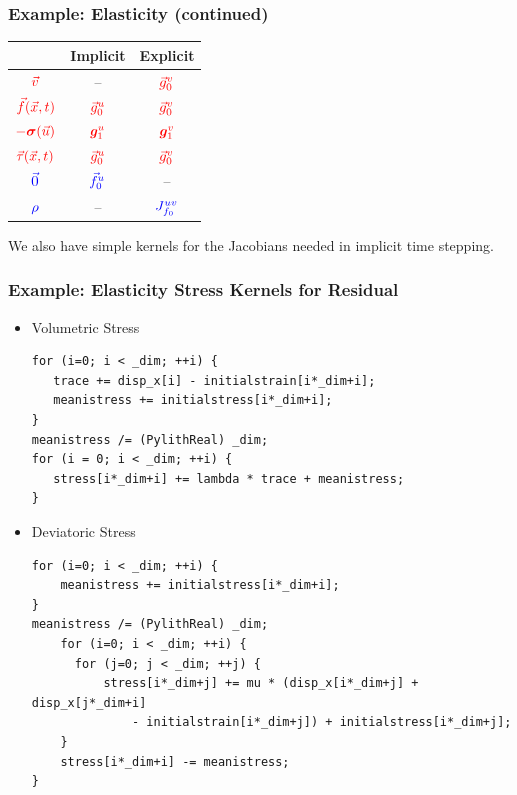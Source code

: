 \documentclass[aspectratio=169,hyperref=colorlinks]{beamer}
\begin{document}
\begin{frame}
  \frametitle{Example: Elasticity (continued)}

  {\centering
  \begin{tabular}{ccc}
    & {\bf Implicit} & {\bf Explicit} \\ \hline
    ${\color{red}\vec{v}}$   &   --   &   ${\color{red}\vec{g}_0^v}$ \\
    ${\color{red}\vec{f}(\vec{x},t)}$   &   ${\color{red}\vec{g}_0^u}$   &   ${\color{red}\vec{g}_0^v}$ \\
    ${\color{red}-\bm{\sigma}(\vec{u})}$   & ${\color{red}\bm{g}_1^u}$   &   ${\color{red}\bm{g}_1^v}$ \\
    ${\color{red}\vec{\tau}(\vec{x},t)}$   &   ${\color{red}\vec{g}_0^u}$   &   ${\color{red}\vec{g}_0^v}$ \\
    ${\color{blue}\vec{0}}$   &   ${\color{blue}\vec{f}_0^u}$ & -- \\
    ${\color{blue}\rho}$ & -- & ${\color{blue}J_{f_0}^{uv}}$ \\
    \hline
  \end{tabular}\par}
  \vfill
  We also have simple kernels for the Jacobians needed in implicit time stepping.

\end{frame}

\begin{frame}[fragile]
  \frametitle{Example: Elasticity Stress Kernels for Residual}
  \summary{}

\begin{itemize}
\item Volumetric Stress
\lstset{language=C}
\begin{lstlisting}[basicstyle=\tiny\ttfamily]
for (i=0; i < _dim; ++i) {
   trace += disp_x[i] - initialstrain[i*_dim+i];
   meanistress += initialstress[i*_dim+i];
}
meanistress /= (PylithReal) _dim;
for (i = 0; i < _dim; ++i) {
   stress[i*_dim+i] += lambda * trace + meanistress;
}
\end{lstlisting}
\item Deviatoric Stress
\begin{lstlisting}[basicstyle=\tiny\ttfamily]
for (i=0; i < _dim; ++i) {
    meanistress += initialstress[i*_dim+i];
}
meanistress /= (PylithReal) _dim;
    for (i=0; i < _dim; ++i) {
      for (j=0; j < _dim; ++j) {
          stress[i*_dim+j] += mu * (disp_x[i*_dim+j] + disp_x[j*_dim+i]
              - initialstrain[i*_dim+j]) + initialstress[i*_dim+j];
    }
    stress[i*_dim+i] -= meanistress;
}
\end{lstlisting}
\end{itemize}

\end{frame}
\end{document}
